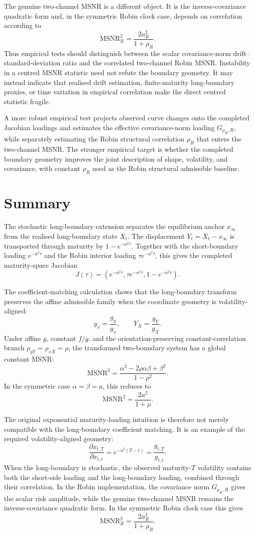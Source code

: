\documentclass[11pt]{article}
\numberwithin{equation}{section}
\begin{document}
The genuine two-channel MSNR is a different object. It is the inverse-covariance quadratic form and, in the symmetric Robin clock case, depends on correlation according to
\[
\mathrm{MSNR}_{R}^2
=
\frac{2a_R^2}{1+\rho_R}.
\]
Thus empirical tests should distinguish between the scalar covariance-norm drift--standard-deviation ratio and the correlated two-channel Robin MSNR. Instability in a centred MSNR statistic need not refute the boundary geometry. It may instead indicate that realised drift estimation, finite-maturity long-boundary proxies, or time variation in empirical correlation make the direct centred statistic fragile.

A more robust empirical test projects observed curve changes onto the completed Jacobian loadings and estimates the effective covariance-norm loading \(G_{\rho_R,R}\), while separately estimating the Robin structural correlation \(\rho_R\) that enters the two-channel MSNR. The stronger empirical target is whether the completed boundary geometry improves the joint description of shape, volatility, and covariance, with constant \(\rho_R\) used as the Robin structural admissible baseline.

\section{Summary}

The stochastic long-boundary extension separates the equilibrium anchor \(x_\infty\) from the realised long-boundary state \(X_t\). The displacement \(Y_t=X_t-x_\infty\) is transported through maturity by \(1-e^{-a^2\tau}\). Together with the short-boundary loading \(e^{-a^2\tau}\) and the Robin interior loading \(\tau e^{-a^2\tau}\), this gives the completed maturity-space Jacobian
\[
J(\tau)=
\left(
 e^{-a^2\tau},
 \tau e^{-a^2\tau},
 1-e^{-a^2\tau}
\right).
\]

The coefficient-matching calculation shows that the long-boundary transform preserves the affine admissible family when the coordinate geometry is volatility-aligned:
\[
y_x=\frac{g_y}{g_x},
\qquad
Y_X=\frac{g_Y}{g_X}.
\]
Under affine \(g\), constant \(f/g\), and the orientation-preserving constant-correlation branch \(\rho_{yY}=\rho_{xX}=\rho\), the transformed two-boundary system has a global constant MSNR:
\[
\mathrm{MSNR}^2
=
\frac{\alpha^2-2\rho\alpha\beta+\beta^2}{1-\rho^2}.
\]
In the symmetric case \(\alpha=\beta=a\), this reduces to
\[
\mathrm{MSNR}^2=\frac{2a^2}{1+\rho}.
\]

The original exponential maturity-loading intuition is therefore not merely compatible with the long-boundary coefficient matching. It is an example of the required volatility-aligned geometry:
\[
\frac{\partial x_{t,T}}{\partial x_{t,t}}
=
e^{-a^2(T-t)}
=
\frac{g_{t,T}}{g_{t,t}}.
\]
When the long-boundary is stochastic, the observed maturity-\(T\) volatility contains both the short-side loading and the long-boundary loading, combined through their correlation. In the Robin implementation, the covariance norm \(G_{\rho_R,R}\) gives the scalar risk amplitude, while the genuine two-channel MSNR remains the inverse-covariance quadratic form. In the symmetric Robin clock case this gives
\[
\mathrm{MSNR}_{R}^2=\frac{2a_R^2}{1+\rho_R}.
\]
\end{document}
